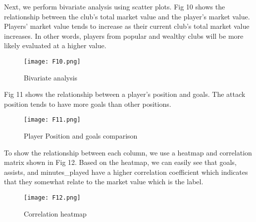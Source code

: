 \documentclass[conference]{IEEEtran}
\begin{document}
Next, we perform bivariate analysis using scatter plots. Fig 10 shows the relationship between the club’s total market value and the player’s market value. Players' market value tends to increase as their current club's total market value increases. In other words, players from popular and wealthy clubs will be more likely evaluated at a higher value.
\begin{figure}[ht]
\begin{center}
\centerline{\texttt{[image: F10.png]}}
\caption{Bivariate analysis}
\label{bayespic}
\end{center}
\end{figure}
Fig 11 shows the relationship between a player's position and goals. The attack position tends to have more goals than other positions.
\begin{figure}[ht]
\begin{center}
\centerline{\texttt{[image: F11.png]}}
\caption{Player Position and goals comparison}
\label{bayespic}
\end{center}
\end{figure}

To show the relationship between each column, we use a heatmap and correlation matrix shown in Fig 12. Based on the heatmap, we can easily see that goals, assists, and minutes\_played have a higher correlation coefficient which indicates that they somewhat relate to the market value which is the label.
\begin{figure}[ht]
\begin{center}
\centerline{\texttt{[image: F12.png]}}
\caption{Correlation heatmap}
\label{bayespic}
\end{center}
\end{figure}
\end{document}

